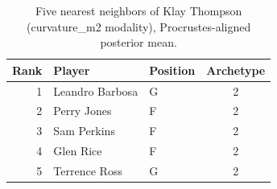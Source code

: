 \begin{table}[htbp]
  \centering\small
  \begin{tabular}{rllc}
    \toprule
    Rank & Player & Position & Archetype \\
    \midrule
    1 & Leandro Barbosa & G & 2 \\
    2 & Perry Jones & F & 2 \\
    3 & Sam Perkins & F & 2 \\
    4 & Glen Rice & F & 2 \\
    5 & Terrence Ross & G & 2 \\
    \bottomrule
  \end{tabular}
  \caption{Five nearest neighbors of Klay Thompson (curvature_m2 modality), Procrustes-aligned posterior mean.}
  \label{tab:Klay_Thompson_neighbors_curvature_m2}
\end{table}

